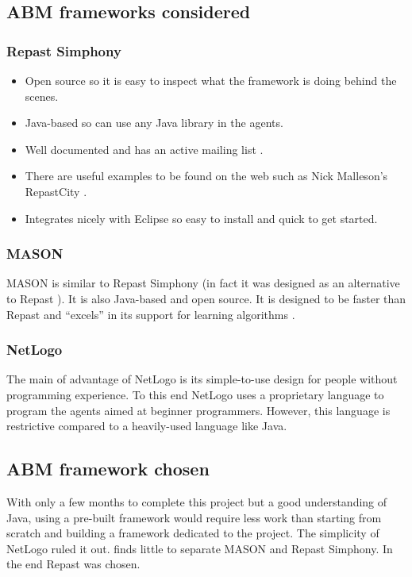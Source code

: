     \subsection{ABM frameworks considered}
    \subsubsection{Repast Simphony}
    \begin{itemize}
      \item Open source so it is easy to inspect what the framework is doing behind the scenes.
      \item Java-based so can use any Java library in the agents.
      \item Well documented and has an active mailing list \cite{Repast}.
      \item There are useful examples to be found on the web such as Nick Malleson's RepastCity \cite{Malleson}.
      \item Integrates nicely with Eclipse so easy to install and quick to get started.
    \end{itemize}    
        
    \subsubsection{MASON}
    MASON is similar to Repast Simphony (in fact it was designed as an alternative to Repast \cite{Allan2009}). It is also Java-based and open source. It is designed to be faster than Repast and ``excels'' in its support for learning algorithms \cite{Berryman2008}.
      
    \subsubsection{NetLogo}
    The main of advantage of NetLogo is its simple-to-use design for people without programming experience. To this end NetLogo uses a proprietary language to program the agents aimed at beginner programmers. However, this language is restrictive compared to a heavily-used language like Java.
    
    \subsection{ABM framework chosen}
    With only a few months to complete this project but a good understanding of Java, using a pre-built framework would require less work than starting from scratch and building a framework dedicated to the project. The simplicity of NetLogo ruled it out. \textcite{Berryman2008} finds little to separate MASON and Repast Simphony. In the end Repast was chosen. 
    
